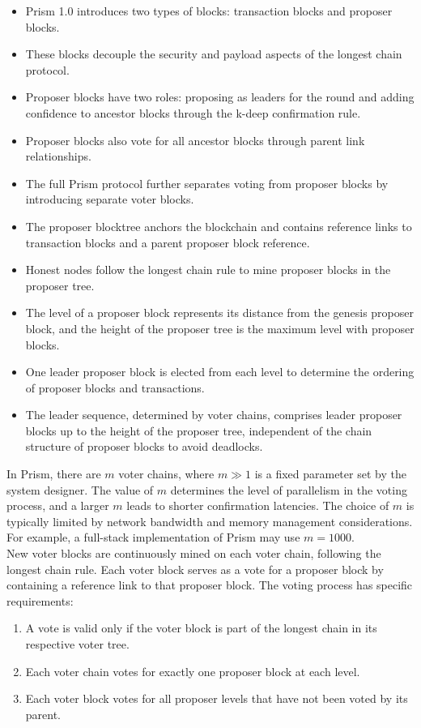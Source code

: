 \documentclass{report}
\begin{document}
\begin{itemize}
	\item Prism 1.0 introduces two types of blocks: transaction blocks and proposer blocks.
	\item These blocks decouple the security and payload aspects of the longest chain protocol.
	\item Proposer blocks have two roles: proposing as leaders for the round and adding confidence to ancestor blocks through the k-deep confirmation rule.
	\item Proposer blocks also vote for all ancestor blocks through parent link relationships.
	\item The full Prism protocol further separates voting from proposer blocks by introducing separate voter blocks.
	\item The proposer blocktree anchors the blockchain and contains reference links to transaction blocks and a parent proposer block reference.
	\item Honest nodes follow the longest chain rule to mine proposer blocks in the proposer tree.
	\item The level of a proposer block represents its distance from the genesis proposer block, and the height of the proposer tree is the maximum level with proposer blocks.
	\item One leader proposer block is elected from each level to determine the ordering of proposer blocks and transactions.
	\item The leader sequence, determined by voter chains, comprises leader proposer blocks up to the height of the proposer tree, independent of the chain structure of proposer blocks to avoid deadlocks.
\end{itemize}
In Prism, there are $m$ voter chains, where $m ≫ 1$ is a fixed parameter set by the system designer. The value of $m$ determines the level of parallelism in the voting process, and a larger $m$ leads to shorter confirmation latencies. The choice of $m$ is typically limited by network bandwidth and memory management considerations. For example, a full-stack implementation of Prism may use $m = 1000$.\\
New voter blocks are continuously mined on each voter chain, following the longest chain rule. Each voter block serves as a vote for a proposer block by containing a reference link to that proposer block. The voting process has specific requirements: 
\begin{enumerate}
	\item A vote is valid only if the voter block is part of the longest chain in its respective voter tree.
	\item Each voter chain votes for exactly one proposer block at each level.
	\item Each voter block votes for all proposer levels that have not been voted by its parent.
\end{enumerate}
\end{document}
